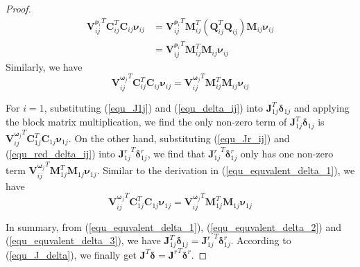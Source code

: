 \documentclass{vgtc}                          %
\begin{document}
\begin{proof}
	\begin{equation} \label{equ_equvalent_delta_1}
		\begin{split}
			{\bm{V}^{\bm{\rho}_{i}}_{ij}}^{T}\mathbf{C}_{ij}^{T}\mathbf{C}_{ij}\bm{\nu}_{ij} & = {\bm{V}^{{\bm{\rho}}_{i}}_{ij}}^{T}\mathbf{M}_{ij}^{T}\left( \mathbf{Q}_{ij}^{T}\mathbf{Q}_{ij}\right) \mathbf{M}_{ij}\bm{\nu}_{ij} \\
			& = {\bm{V}^{{\bm{\rho}}_{i}}_{ij}}^{T}\mathbf{M}_{ij}^{T}\mathbf{M}_{ij}\bm{\nu}_{ij}
		\end{split}
	\end{equation}
	Similarly, we have 
	\begin{equation} \label{equ_equvalent_delta_2}
		{\bm{V}^{\bm{\omega}_{j}}_{ij}}^{T}\mathbf{C}_{ij}^{T}\mathbf{C}_{ij}\bm{\nu}_{ij} = {\bm{V}^{\bm{\omega}_{j}}_{ij}}^{T}\mathbf{M}_{ij}^{T}\mathbf{M}_{ij}\bm{\nu}_{ij}
	\end{equation}
	
	For $ i = 1$, substituting (\ref{equ_J1j}) and (\ref{equ_delta_ij}) into $\mathbf{J}_{1j}^{T}\bm{\delta}_{1j}$ and applying the block matrix multiplication, we find the only non-zero term of $\mathbf{J}_{1j}^{T}\bm{\delta}_{1j}$ is ${\bm{V}^{\bm{\omega}_{j}}_{ij}}^{T}\mathbf{C}_{1j}^{T}\mathbf{C}_{1j}\bm{\nu}_{1j} $. On the other hand, substituting (\ref{equ_Jr_ij}) and (\ref{equ_red_delta_ij}) into ${\mathbf{J}_{1j}^{r}}^{T}\bm{\delta}_{1j}^{r}$, we find that ${\mathbf{J}_{1j}^{r}}^{T}\bm{\delta}_{1j}^{r}$ only has one non-zero term ${\bm{V}^{\bm{\omega}_{j}}_{ij}}^{T}\mathbf{M}_{1j}^{T}\mathbf{M}_{1j}\bm{\nu}_{1j} $. Similar to the derivation  in (\ref{equ_equvalent_delta_1}), we have
	\begin{equation}\label{equ_equvalent_delta_3}
		{\bm{V}^{\bm{\omega}_{j}}_{ij}}^{T}\mathbf{C}_{1j}^{T}\mathbf{C}_{1j}\bm{\nu}_{1j}  = {\bm{V}^{\bm{\omega}_{j}}_{ij}}^{T}\mathbf{M}_{1j}^{T}\mathbf{M}_{1j}\bm{\nu}_{1j} 
	\end{equation}
	
	In summary, from  (\ref{equ_equvalent_delta_1}), (\ref{equ_equvalent_delta_2}) and (\ref{equ_equvalent_delta_3}), we have $\mathbf{J}_{1j}^{T}\bm{\delta}_{1j} = {\mathbf{J}_{1j}^{r}}^{T}\bm{\delta}_{1j}^{r}$. According to (\ref{equ_J_delta}), we finally get $\mathbf{J}^{T}\bm{\delta} = {\mathbf{J}^r}^{T}\bm{\delta}^{r}$. 
\end{proof}

\end{document}
